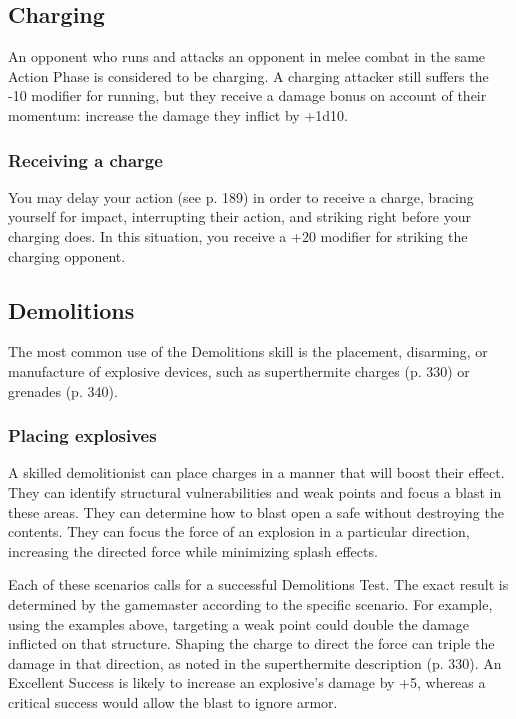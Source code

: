 \subsection{Charging}
\label{sec:charging}

An opponent who runs and attacks an opponent in melee combat in the same Action Phase is considered to be charging. A charging attacker still suffers the -10 modifier for running, but they receive a damage bonus on account of their momentum: increase the damage they inflict by +1d10.

\subsubsection{Receiving a charge}

You may delay your action (see p. 189) in order to receive a charge, bracing yourself for impact, interrupting their action, and striking right before your charging does. In this situation, you receive a +20 modifier for striking the charging opponent.


\subsection{Demolitions}
\label{sec:demolitions}

The most common use of the Demolitions skill is the placement, disarming, or manufacture of explosive devices, such as superthermite charges (p. 330) or grenades (p. 340).

\subsubsection{Placing explosives}

A skilled demolitionist can place charges in a manner that will boost their effect. They can identify structural vulnerabilities and weak points and focus a blast in these areas. They can determine how to blast open a safe without destroying the contents. They can focus the force of an explosion in a particular direction, increasing the directed force while minimizing splash effects.

Each of these scenarios calls for a successful Demolitions Test. The exact result is determined by the gamemaster according to the specific scenario. For example, using the examples above, targeting a weak point could double the damage inflicted on that structure. Shaping the charge to direct the force can triple the damage in that direction, as noted in the superthermite description (p. 330). An Excellent Success is likely to increase an explosive’s damage by +5, whereas a critical success would allow the blast to ignore armor.

